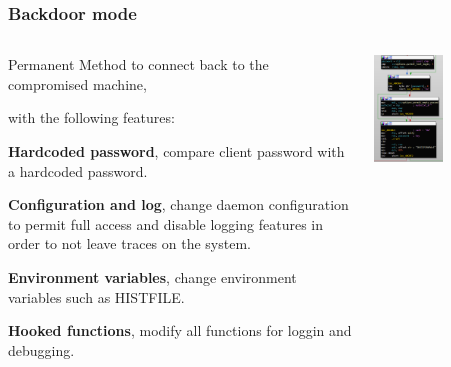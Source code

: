 \begin{frame}
	\frametitle{Backdoor mode}
	
  \begin{columns}
  \begin{column}{0.5\textwidth}
	Permanent Method to connect back to the compromised machine, 
	
	\medskip

	with the following features:

	\smallskip

  \textbf{Hardcoded password}, compare client password with a hardcoded password.

  \smallskip

  \textbf{Configuration and log}, change daemon configuration to permit full access and disable logging features in order to not leave traces on the system.

  \smallskip

  \textbf{Environment variables}, change environment variables such as \textsc{HISTFILE}.

  \smallskip

  \textbf{Hooked functions}, modify all functions for loggin and debugging.

  \end{column}
  \begin{column}{0.5\textwidth}
      \begin{center}
      
       \includegraphics[width=0.5\textwidth]{images/hardcoded_password}
       \end{center}
  \end{column}
  \end{columns}

\end{frame}
